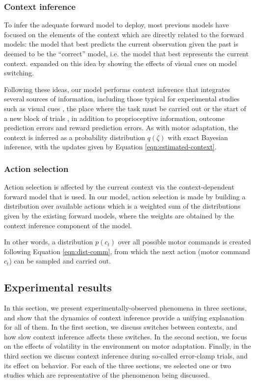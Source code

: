 \documentclass[a4paper,doc,floatsintext,natbib]{apa6}%
\def \eref #1{Equation \ref{#1}}   %
\begin{document}
\subsubsection{Context inference}
To infer the adequate forward model to deploy, most previous models \cite[e.g.][]{Wolpert_Multiple_1998,Imamizu_Neural_2008,Oh_Minimizing_2019} have focused on the elements of the context which are directly related to the forward models: the model that best predicts the current observation given the past is deemed to be the ``correct'' model, i.e. the model that best represents the current context. \cite{Imamizu_Explicit_2007} expanded on this idea by showing the effects of visual cues on model switching.

Following these ideas, our model performs context inference that integrates several sources of information, including those typical for experimental studies such as visual cues \citep{Lee_Dual_2009,Kim_Neural_2015}, the place where the task must be carried out \citep{Forano_Timescales_2020,Shadmehr_Adaptive_1994} or the start of a new block of trials \citep{Ethier_Spontaneous_2008}, in addition to proprioceptive information, outcome prediction errors and reward prediction errors. As with motor adaptation, the context is inferred as a probability distribution $q(\zeta)$ with exact Bayesian inference, with the updates given by \eref{eqn:estimated-context}.

\subsubsection{Action selection}
Action selection is affected by the current context via the context-dependent forward model that is used. In our model, action selection is made by building a distribution over available actions which is a weighted sum of the distributions given by the existing forward models, where the weights are obtained by the context inference component of the model.

In other words, a distribution $p(c_t)$ over all possible motor commands is created following \eref{eqn:dist-comm}, from which the next action (motor command $c_t$) can be sampled and carried out.

\subsection{Experimental results}
In this section, we present experimentally-observed phenomena in three sections, and show that the dynamics of context inference provide a unifying explanation for all of them. In the first section, we discuss switches between contexts, and how slow context inference affects these switches. In the second section, we focus on the effects of volatility in the environment on motor adaptation. Finally, in the third section we discuss context inference during so-called error-clamp trials, and its effect on behavior. For each of the three sections, we selected one or two studies which are representative of the phenomenon being discussed.
\end{document}
